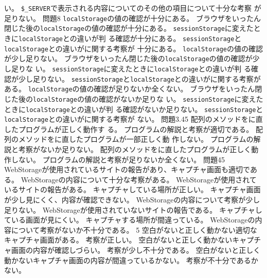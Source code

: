 {{{い。}
{\texttt{\$\_SERVER}で表示される内容についてのその他の項目について十分な考察
が足りない。}
}
{問題\hspace*{1zw}\newline\hspace*{0.5zw}{3.1～3.3}\newline\hspace*{0.7zw}\Must}{8}
{
{\texttt{localStorage}の値の確認が十分にある。}
{ブラウザをいったん閉じた後の\texttt{localStorage}の値の確認が十分にある。}
{\texttt{sessionStorage}に変えたときに\texttt{localStorage}との違いが判
る確認が十分にある。}
{\texttt{sessionStorage}と\texttt{localStorage}との違いがに関する考察が
十分にある。}
}
{
{\texttt{localStorage}の値の確認が少し足りない。}
{ブラウザをいったん閉じた後の\texttt{localStorage}の値の確認が少し足りな
い。}
{\texttt{sessionStorage}に変えたときに\texttt{localStorage}との違いが判
る確認が少し足りない。}
{\texttt{sessionStorage}と\texttt{localStorage}との違いがに関する考察がある。}
}
{
{\texttt{localStorage}の値の確認が足りないか全くない。}
{ブラウザをいったん閉じた後の\texttt{localStorage}の値の確認がないか足りな
い。}
{\texttt{sessionStorage}に変えたときに\texttt{localStorage}との違いが判
る確認がないか足りない。}
{\texttt{sessionStorage}と\texttt{localStorage}との違いがに関する考察が
ない。}
}
{問題3.4}{5}
{
{配列のメソッドをに直したプログラムが正しく動作す
る。}
{プログラムの解説と考察が適切である。}
}
{
{配列のメソッドをに直したプログラムが一部正しく動
作しない。}
{プログラムの解説と考察がないか足りない。}
}
{
{配列のメソッドをに直したプログラムが正しく動
作しない。}
{プログラムの解説と考察が足りないか全くない。}
}
{問題4}{5}
{
{WebStorageが使用されているサイトの報告があり、キャプチャ画面も適切であ
る。}
{WebStorageの内容について十分な考察がある。}
}
{
{WebStorageが使用されているサイトの報告がある。}
{キャプチャしている場所が正しい。}
{キャプチャ画面が少し見にくく、内容が確認できない。}
{WebStorageの内容について考察が少し足りない。}
}
{
{WebStorageが使用されていないサイトの報告である。}
{キャプチャしている画面が見にくい。}
{キャプチャする場所が間違っている。}
{WebStorageの内容について考察がないか不十分である。}
}
{}{5}
{
{空白がないと正しく動かない適切なキャプチャ画面がある。}
{考察が正しい。}
}
{
{空白がないと正しく動かないキャプチャ画面の内容が確認しづらい。}
{考察が少し不十分である。}
}
{
{空白がないと正しく動かないキャプチャ画面の内容が間違っているかない。}
{考察が不十分であるかない。}
}
}